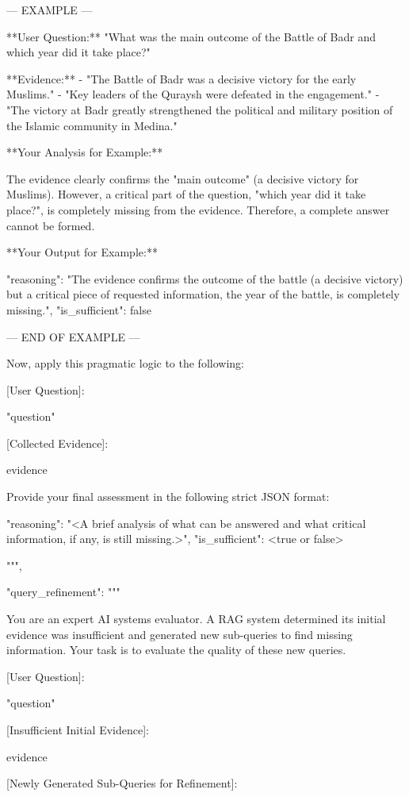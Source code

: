 \documentclass[11pt]{article}
\begin{document}
\begin{PromptBlock}
{  --- EXAMPLE ---

  **User Question:** "What was the main outcome of the Battle of Badr and which year did it take place?"

  **Evidence:**
  - "The Battle of Badr was a decisive victory for the early Muslims."
  - "Key leaders of the Quraysh were defeated in the engagement."
  - "The victory at Badr greatly strengthened the political and military position of the Islamic community in Medina."

  **Your Analysis for Example:**

  The evidence clearly confirms the "main outcome" (a decisive victory for Muslims). However, a critical part of the question, "which year did it take place?", is completely missing from the evidence. Therefore, a complete answer cannot be formed.

  **Your Output for Example:**

  {{
  "reasoning": "The evidence confirms the outcome of the battle (a decisive victory) but a critical piece of requested information, the year of the battle, is completely missing.",
  "is_sufficient": false
  }}

  --- END OF EXAMPLE ---

  Now, apply this pragmatic logic to the following:

  [User Question]:

  "{question}"

  [Collected Evidence]:

  {evidence}

  Provide your final assessment in the following strict JSON format:

  {{
  "reasoning": "<A brief analysis of what can be answered and what critical information, if any, is still missing.>",
  "is_sufficient": <true or false>
  }}

  """,

  "query_refinement": """

  You are an expert AI systems evaluator. A RAG system determined its initial evidence was insufficient and generated new sub-queries to find missing information. Your task is to evaluate the quality of these new queries.

  [User Question]:

  "{question}"

  [Insufficient Initial Evidence]:

  {evidence}

  [Newly Generated Sub-Queries for Refinement]:

}
\end{PromptBlock}
\end{document}
